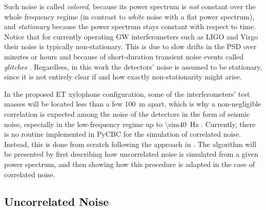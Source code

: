Such noise is called \emph{colored}, because its power spectrum is \emph{not} constant over the whole frequency regime (in contrast to \emph{white} noise with a flat power spectrum), and \emph{stationary} because the power spectrum stays constant with respect to time. Notice that for currently operating GW interferometers such as LIGO and Virgo their noise is typically non-stationary. This is due to slow drifts in the PSD over minutes or hours and because of short-duration transient noise events called \emph{glitches} \cite{Abbott_2020}. Regardless, in this work the detectors' noise is assumed to be stationary, since it is not entirely clear if and how exactly non-stationarity might arise.

In the proposed ET xylophone configuration, some of the interferometers' test masses will be located less than a few \SI{100}{\meter} apart, which is why a non-negligible correlation is expected among the noise of the detectors in the form of seismic noise, especially in the low-frequency regime up to \SI{\sim40}{\hertz} \cite{PhysRevD.109.102002}. Currently, there is no routine implemented in PyCBC for the simulation of correlated noise. Instead, this is done from scratch following the approach in \cite{PhysRevD.110.104060}. The algorithm will be presented by first describing how uncorrelated noise is simulated from a given power spectrum, and then showing how this procedure is adapted in the case of correlated noise.

\subsection*{Uncorrelated Noise}

